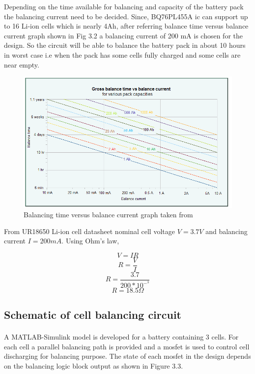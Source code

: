 Depending on the time available for balancing and capacity of the battery pack the balancing current need to be decided. Since, BQ76PL455A \acrshort{ic} can support up to 16 Li-ion cells which is nearly 4Ah, after referring balance time versus balance current graph shown in Fig 3.2 a balancing current of 200 mA is chosen for the design. So the circuit will be able to balance the battery pack in about 10 hours in worst case i.e when the pack has some cells fully charged and some cells are near empty.

\vspace{0.5cm}

\begin{figure}[h!]
    \centering
    \includegraphics[scale = 0.72]{Chapter3/Figures/balcurrent_graph.PNG}
    \caption{Balancing time versus balance current graph taken from \cite{wpbalcur} }
\end{figure}

From UR18650 Li-ion cell datasheet nominal cell voltage $V = 3.7V$ and balancing current $I= 200 mA$. Using Ohm's law,

\[ V = IR\]
\[ R = \frac{V}{I}\]
\[ R = \frac{3.7}{200 *10^-^3}\]
\[ R = 18.5 \Omega\]

\subsection{Schematic of cell balancing circuit}
A MATLAB\textsuperscript{\textregistered}-Simulink\textsuperscript{\textregistered} model is developed for a battery containing 3 cells. For each cell a parallel balancing path is provided and a \acrshort{mosfet} is used to control cell discharging for balancing purpose. The state of each \acrshort{mosfet} in the design depends on the balancing logic block output as shown in Figure 3.3.

